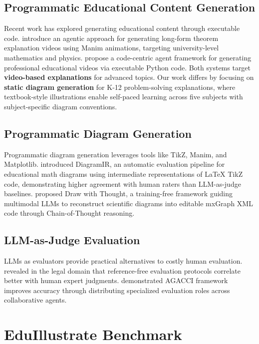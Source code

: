 \documentclass[11pt]{article}
\begin{document}
\subsection{Programmatic Educational Content Generation}

Recent work has explored generating educational content through executable code. \citet{ku2025theoremexplain} introduce an agentic approach for generating long-form theorem explanation videos using Manim animations, targeting university-level mathematics and physics. \citet{chen2025code2video} propose a code-centric agent framework for generating professional educational videos via executable Python code. Both systems target \textbf{video-based explanations} for advanced topics. Our work differs by focusing on \textbf{static diagram generation} for K-12 problem-solving explanations, where textbook-style illustrations enable self-paced learning across five subjects with subject-specific diagram conventions.

\subsection{Programmatic Diagram Generation}

Programmatic diagram generation leverages tools like TikZ, Manim, and Matplotlib. \citet{kumar2025diagramir} introduced DiagramIR, an automatic evaluation pipeline for educational math diagrams using intermediate representations of LaTeX TikZ code, demonstrating higher agreement with human raters than LLM-as-judge baselines. \citet{cui2025draw} proposed Draw with Thought, a training-free framework guiding multimodal LLMs to reconstruct scientific diagrams into editable mxGraph XML code through Chain-of-Thought reasoning.

\subsection{LLM-as-Judge Evaluation}

LLMs as evaluators provide practical alternatives to costly human evaluation. \citet{lee2025lemaj} revealed in the legal domain that reference-free evaluation protocols correlate better with human expert judgments. \citet{park2025agacci} demonstrated AGACCI framework improves accuracy through distributing specialized evaluation roles across collaborative agents.

\section{EduIllustrate Benchmark}
\end{document}
